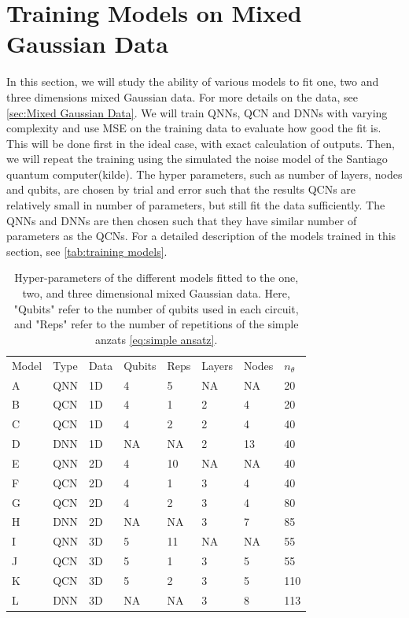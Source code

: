 \section{Training Models on Mixed Gaussian Data}\label{sec:Training Models}
In this section, we will study the ability of various models to fit one, two and three dimensions mixed Gaussian data. For more details on the data, see \autoref{sec:Mixed Gaussian Data}. We will train QNNs, QCN and DNNs with varying complexity and use MSE on the training data to evaluate how good the fit is. This will be done first in the ideal case, with exact calculation of outputs. Then, we will repeat the training using the  simulated the noise model of the Santiago quantum computer(kilde). The hyper parameters, such as number of layers, nodes and qubits, are chosen by trial and error such that the results QCNs are relatively small in number of parameters, but still fit the data sufficiently. The QNNs and DNNs are then chosen such that they have similar number of parameters as the QCNs. For a detailed description of the models trained in this section, see \autoref{tab:training models}.

\begin{table}[H]
\centering
\caption{Hyper-parameters of the different models fitted to the one, two, and three dimensional mixed Gaussian data. Here, "Qubits" refer to the number of qubits used in each circuit, and "Reps" refer to the number of repetitions of the simple anzats \autoref{eq:simple ansatz}.} 
\begin{tabular}{|l|l|l|l|l|l|l|l|}
\hline
Model& Type& Data& Qubits& Reps& Layers & Nodes &$n_{\theta}$ \\ \Xhline{3\arrayrulewidth}
A    & QNN & 1D  & 4     & 5&NA     & NA& 20   \\ \hline
B    & QCN & 1D  & 4     & 1&2      & 4& 20 \\ \hline
C    & QCN & 1D  & 4     & 2&2      & 4& 40  \\ \hline
D    & DNN & 1D  & NA    & NA&2      & 13& 40  \\ \Xhline{3\arrayrulewidth}
E    & QNN & 2D  & 4     & 10&NA     & NA& 40  \\ \hline
F    & QCN & 2D  & 4     & 1&3      & 4& 40  \\ \hline
G    & QCN & 2D  & 4     & 2&3      & 4& 80  \\ \hline
H    & DNN & 2D  & NA    & NA&3      & 7& 85  \\ \Xhline{3\arrayrulewidth}
I    & QNN & 3D  & 5     & 11&NA     & NA& 55  \\ \hline
J    & QCN & 3D  & 5     & 1&3      & 5& 55  \\ \hline
K    & QCN & 3D  & 5     & 2&3      & 5& 110  \\ \hline
L    & DNN & 3D  & NA    & NA&3      & 8& 113  \\ \hline
\end{tabular}

\label{tab:training models}
\end{table}

